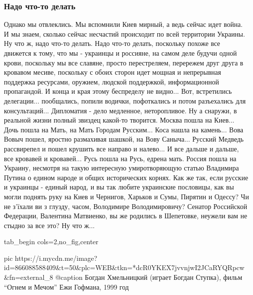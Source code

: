  
 
 
 
 

\subsubsection{Надо что-то делать}

Однако мы отвлеклись. Мы вспомнили Киев мирный, а ведь сейчас идет война. И мы
знаем, сколько сейчас несчастий происходит по всей территории Украины. Ну что
ж, надо что-то делать. Надо что-то делать, поскольку похоже все движется к
тому, что мы - украинцы и россияне, на самом деле будучи одной крови, поскольку
мы все славяне, просто перестреляем, перережем друг друга в кровавом месиве,
поскольку с обоих сторон идет мощная и непрерывная поддержка ресурсами,
оружием, людской поддержкой, информационной пропагандой. И конца и края этому
беспределу не видно... Вот, встретились делегации... пообщались, попили
водички, пофоткались и потом разъехались для консультаций... Дипломатия - дело
медленное, неторопливое. Ну а снаружи, в реальной жизни полный звиздец какой-то
творится. Москва пошла на Киев... Дочь пошла на Мать, на Мать Городам
Русским... Коса нашла на камень... Вова Вовыч пошел, яростно размахивая шашкой,
на Вову Саныча... Русский Медведь рассвирепел и пошел крушить все направо и
налево... И все дальше и дальше, все кровавей и кровавей... Русь пошла на Русь,
едрена мать. Россия пошла на Украину, несмотря на такую интересную
умиротворяющую статью Владимира Путина о едином народе и общих исторических
корнях. Как же так, если русские и украинцы - единый народ, и вы так любите
украинские пословицы, как вы могли поднять руку на Киев и Чернигов, Харьков и
Сумы, Пирятин и Одессу? Чи не з'їхали ви з глузду, часом, Володимире
Володимировичу? Сенатор Российской Федерации, Валентина Матвиенко, вы же
родились в Шепетовке, неужели вам не стыдно за все это? Ну что ж... 

\ifcmt
  tab_begin cols=2,no_fig,center

		 pic https://i.mycdn.me/image?id=866088588409&t=50&plc=WEB&tkn=*dcR0YKEX7jvvnjwI2JCaRYQRpcw&fn=external_8
		 @caption Богдан Хмельницкий (играет Богдан Ступка), фильм \enquote{Огнем и Мечом} Ежи Гофмана, 1999 год

